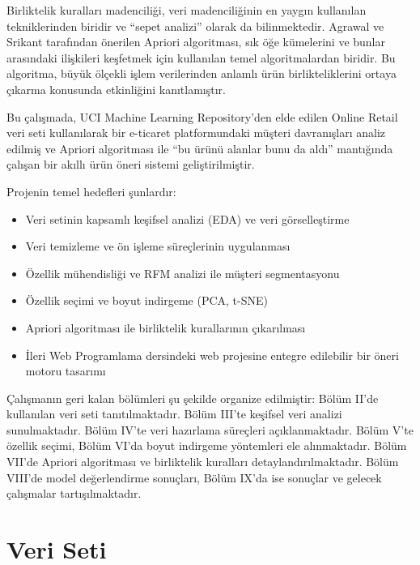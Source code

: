 \documentclass[conference]{IEEEtran}
\begin{document}
Birliktelik kuralları madenciliği, veri madenciliğinin en yaygın kullanılan tekniklerinden biridir ve ``sepet analizi'' olarak da bilinmektedir. Agrawal ve Srikant \cite{agrawal1994} tarafından önerilen Apriori algoritması, sık öğe kümelerini ve bunlar arasındaki ilişkileri keşfetmek için kullanılan temel algoritmalardan biridir. Bu algoritma, büyük ölçekli işlem verilerinden anlamlı ürün birlikteliklerini ortaya çıkarma konusunda etkinliğini kanıtlamıştır.

Bu çalışmada, UCI Machine Learning Repository'den elde edilen Online Retail veri seti \cite{kaggle_ecommerce} kullanılarak bir e-ticaret platformundaki müşteri davranışları analiz edilmiş ve Apriori algoritması ile ``bu ürünü alanlar bunu da aldı'' mantığında çalışan bir akıllı ürün öneri sistemi geliştirilmiştir.

Projenin temel hedefleri şunlardır:
\begin{itemize}[leftmargin=*]
    \item Veri setinin kapsamlı keşifsel analizi (EDA) ve veri görselleştirme
    \item Veri temizleme ve ön işleme süreçlerinin uygulanması
    \item Özellik mühendisliği ve RFM analizi ile müşteri segmentasyonu
    \item Özellik seçimi ve boyut indirgeme (PCA, t-SNE)
    \item Apriori algoritması ile birliktelik kurallarının çıkarılması
    \item İleri Web Programlama dersindeki web projesine entegre edilebilir bir öneri motoru tasarımı
\end{itemize}

Çalışmanın geri kalan bölümleri şu şekilde organize edilmiştir: Bölüm II'de kullanılan veri seti tanıtılmaktadır. Bölüm III'te keşifsel veri analizi sunulmaktadır. Bölüm IV'te veri hazırlama süreçleri açıklanmaktadır. Bölüm V'te özellik seçimi, Bölüm VI'da boyut indirgeme yöntemleri ele alınmaktadır. Bölüm VII'de Apriori algoritması ve birliktelik kuralları detaylandırılmaktadır. Bölüm VIII'de model değerlendirme sonuçları, Bölüm IX'da ise sonuçlar ve gelecek çalışmalar tartışılmaktadır.

\section{Veri Seti}
\end{document}
